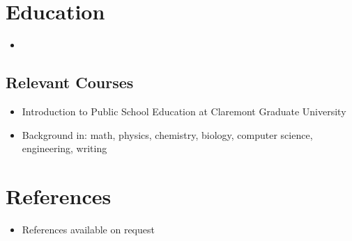 \documentclass[11pt,a4paper,sans]{moderncv}        %
\begin{document}
\section{Education}



\begin{itemize}

\item{}



\end{itemize}


\subsection{Relevant Courses}


\begin{itemize}
\item{Introduction to Public School Education at Claremont Graduate University}
\item{Background in: math, physics, chemistry, biology, computer science, engineering, writing}
\end{itemize}

\section{References}

 
\begin{itemize}

\item{References available on request}

\end{itemize}

\nocite{*}



\end{document}
